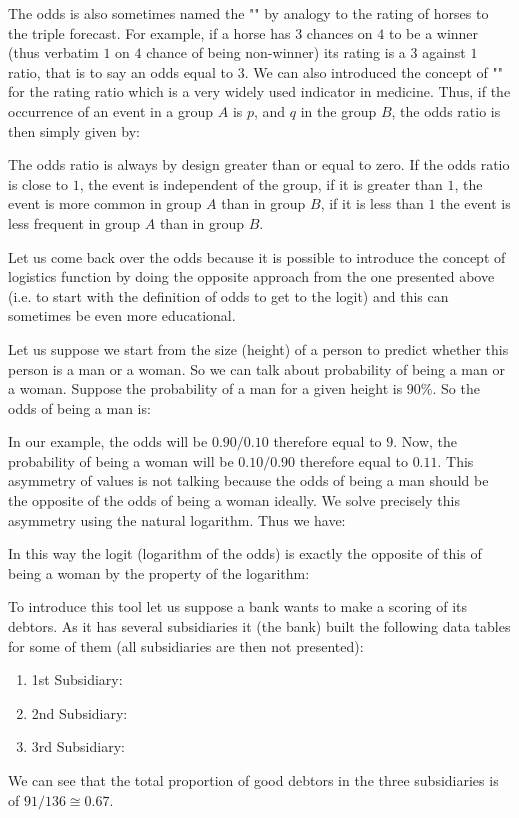 	\pagebreak
	\begin{tcolorbox}[title=Remark,colframe=black,arc=10pt]
	The odds is also sometimes named the "" by analogy to the rating of horses to the triple forecast. For example, if a horse has $3$ chances on $4$ to be a winner (thus verbatim $1$ on $4$ chance of being non-winner) its rating is a $3$ against $1$ ratio, that is to say an odds equal to $3$. We can also introduced the concept of "" for the rating ratio which is a very widely used indicator in medicine. Thus, if the occurrence of an event in a group $A$ is $p$, and $q$ in the group $B$, the odds ratio is then simply given by:
	
	The odds ratio is always by design greater than or equal to zero. If the odds ratio is close to $1$, the event is independent of the group, if it is greater than $1$, the event is more common in group $A$ than in group $B$, if it is less than $1$ the event is less frequent in group $A$ than in group $B$.
	\end{tcolorbox}
	Let us come back over the odds because it is possible to introduce the concept of logistics function by doing the opposite approach from the one presented above (i.e. to start with the definition of odds to get to the logit) and this can sometimes be even more educational.
	
	Let us suppose we start from the size (height) of a person to predict whether this person is a man or a woman. So we can talk about probability of being a man or a woman. Suppose the probability of a man for a given height is $90\%$. So the odds of being a man is:
	
	In our example, the odds will be $0.90 / 0.10$ therefore equal to $9$. Now, the probability of being a woman will be $0.10 / 0.90$ therefore equal to $0.11$. This asymmetry of values is not talking because the odds of being a man should be the opposite of the odds of being a woman ideally. We solve precisely this asymmetry using the natural logarithm. Thus we have:
	
	In this way the logit (logarithm of the odds) is exactly the opposite of this of being a woman by the property of the logarithm:
	
	
	\pagebreak
		To introduce this tool let us suppose a bank wants to make a scoring of its debtors. As it has several subsidiaries it (the bank) built the following data tables for some of them (all subsidiaries are then not presented):
	\begin{enumerate}
    	\item 1st Subsidiary:
		
		\item 2nd Subsidiary:
			
		\item 3rd Subsidiary:
		
	\end{enumerate}
	We can see that the total proportion of good debtors in the three subsidiaries is of $91/136 \cong 0.67$.
	
